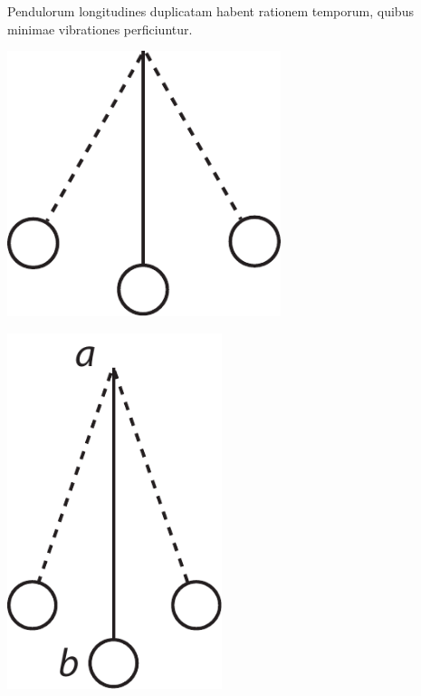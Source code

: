                 \vspace*{8mm}
                \pstart 
                \normalsize
            \noindent[62~r\textsuperscript{o}]  Pendulorum longitudines duplicatam habent rationem temporum, quibus minimae vibrationes\protect{} perficiuntur.\pend \pstart \vspace{2em} \noindent
\begin{minipage}[t]{0.33\textwidth}
\includegraphics[width=0.6\textwidth]{images/62-1.pdf}
\end{minipage}
\hspace*{13,3mm}
\begin{minipage}[t]{0.33\textwidth}
\includegraphics[width=0.47\textwidth]{images/62-2.pdf}
\end{minipage}
\hspace*{13,3mm}

